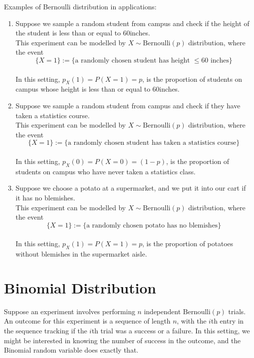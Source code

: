 Examples of Bernoulli distribution in applications:
\begin{enumerate}
    \item Suppose we sample a random student from campus and check if the height of the student is less than or equal to 60inches. 
    \\
    This experiment can be modelled by $X\sim \text{Bernoulli}(p)$ distribution, where the event 
    $$\{X=1\} := \{\text{a randomly chosen student has height $\le 60$ inches}\}$$
    \\
    In this setting, $p_X(1) = P(X=1) = p$, is the proportion of students on campus whose height is less than or equal to 60inches. 
    \item  Suppose we sample a random student from campus and check if they have taken a statistics course. 
    \\
    This experiment can be modelled by $X\sim \text{Bernoulli}(p)$ distribution, where the event 
    $$\{X=1\} := \{\text{a randomly chosen student has taken a statistics course}\}$$
    \\
    In this setting, $p_X(0) = P(X=0) = (1-p)$, is the proportion of students on campus who have never taken a statistics class. 
    \item  Suppose we choose a potato at a supermarket, and we put it into our cart if it has no blemishes.  
    \\
    This experiment can be modelled by $X\sim \text{Bernoulli}(p)$ distribution, where the event 
    $$\{X=1\} := \{\text{a randomly chosen potato has no blemishes}\}$$
    \\
    In this setting, $p_X(1) = P(X=1) = p$, is the proportion of potatoes without blemishes in the supermarket aisle. 
\end{enumerate}

\section[Binomial Distribution]{Binomial Distribution}
Suppose an experiment involves performing $n$ independent $\text{Bernoulli}(p)$ trials. An outcome for this experiment is a sequence of length $n$, with the $i$th entry in the sequence tracking if the $i$th trial was a success or a failure. In this setting, we might be interested in knowing the number of success in the outcome, and the Binomial random variable does exactly that. 
\\




